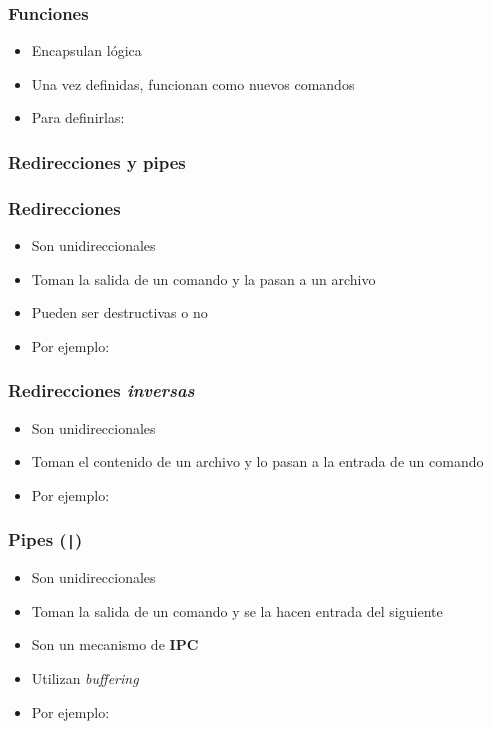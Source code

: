 \begin{frame}
  \frametitle{Funciones}
  \begin{itemize}
    \item Encapsulan lógica
    \item Una vez definidas, funcionan como nuevos comandos
    \item Para definirlas:
%
  \end{itemize}
\end{frame}

\subsubsection{Redirecciones y pipes}

\begin{frame}
  \frametitle{Redirecciones}
  \begin{itemize}
    \item Son unidireccionales
    \item Toman la salida de un comando y la pasan a un archivo
    \item Pueden ser destructivas o no
    \item Por ejemplo:
  \end{itemize}
\end{frame}

\begin{frame}
  \frametitle{Redirecciones \textit{inversas}}
  \begin{itemize}
    \item Son unidireccionales
    \item Toman el contenido de un archivo y lo pasan a la entrada de un comando
    \item Por ejemplo:
  \end{itemize}
\end{frame}

\begin{frame}
  \frametitle{Pipes (\texttt{|})}
  \begin{itemize}
    \item Son unidireccionales
    \item Toman la salida de un comando y se la hacen entrada del siguiente
    \item Son un mecanismo de \textbf{IPC}
    \item Utilizan \textit{buffering}
    \item Por ejemplo:
  \end{itemize}
\end{frame}

